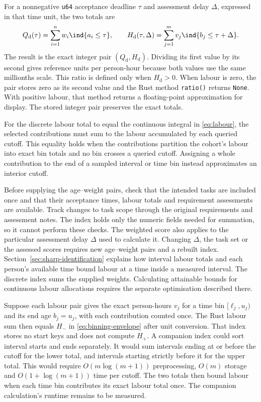For a nonnegative \texttt{u64} acceptance deadline $\tau$ and assessment delay $\Delta$, expressed in that time unit, the two totals are
\begin{equation}
\label{eq:discrete-cohort-totals}
 Q_{\mathrm{d}}(\tau)=\sum_{i=1}^{n} w_i\ind\{a_i\leq\tau\},
 \qquad
 H_{\mathrm{d}}(\tau,\Delta)=\sum_{j=1}^{m}v_j\ind\{b_j\leq\tau+\Delta\}.
\end{equation}
The result is the exact integer pair $(Q_{\mathrm{d}},H_{\mathrm{d}})$. Dividing its first value by its second gives reference units per person-hour because both values use the same millionths scale. This ratio is defined only when $H_{\mathrm{d}}>0$. When labour is zero, the pair stores zero as its second value and the Rust method \texttt{ratio()} returns \texttt{None}. With positive labour, that method returns a floating-point approximation for display. The stored integer pair preserves the exact totals.

For the discrete labour total to equal the continuous integral in \eqref{eq:labour}, the selected contributions must sum to the labour accumulated by each queried cutoff. This equality holds when the contributions partition the cohort's labour into exact bin totals and no bin crosses a queried cutoff. Assigning a whole contribution to the end of a sampled interval or time bin instead approximates an interior cutoff.

Before supplying the age--weight pairs, check that the intended tasks are included once and that their acceptance times, labour totals and requirement assessments are available. Track changes to task scope through the original requirements and assessment notes. The index holds only the numeric fields needed for summation, so it cannot perform these checks. The weighted score also applies to the particular assessment delay $\Delta$ used to calculate it. Changing $\Delta$, the task set or the assessed scores requires new age--weight pairs and a rebuilt index. Section~\ref{sec:sharp-identification} explains how interval labour totals and each person's available time bound labour at a time inside a measured interval. The discrete index sums the supplied weights. Calculating attainable bounds for continuous labour allocations requires the separate optimisation described there.

Suppose each labour pair gives the exact person-hours $v_j$ for a time bin $[\ell_j,u_j)$ and its end age $b_j=u_j$, with each contribution counted once. The Rust labour sum then equals $H_-$ in \eqref{eq:binning-envelope} after unit conversion. That index stores no start keys and does not compute $H_+$. A companion index could sort interval starts and ends separately. It would sum intervals ending at or before the cutoff for the lower total, and intervals starting strictly before it for the upper total. This would require $O(m\log(m+1))$ preprocessing, $O(m)$ storage and $O(1+\log(m+1))$ time per cutoff. The two totals then bound labour when each time bin contributes its exact labour total once. The companion calculation's runtime remains to be measured.

